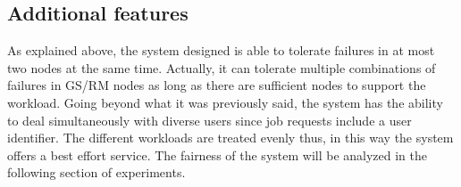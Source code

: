 \subsection{Additional features}

As explained above, the system designed is able to tolerate failures in at most two nodes at the same time. Actually, it can tolerate multiple combinations of failures in GS/RM nodes as long as there are sufficient nodes to support the workload. Going beyond what it was previously said, the system has the ability to deal simultaneously with diverse users since job requests include a user identifier. The different workloads are treated evenly thus, in this way the system offers a best effort service. The fairness of the system will be analyzed in the following section of experiments.